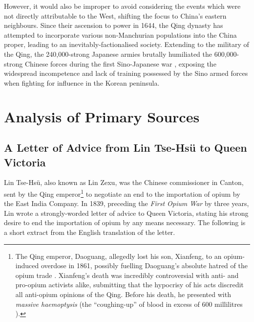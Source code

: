 \documentclass{article}
\begin{document}
However, it would also be improper to avoid considering the events which were not directly attributable to the West, shifting the focus to China's eastern neighbours. Since their ascension to power in 1644, the Qing dynasty has attempted to incorporate various non-Manchurian populations into the China proper, leading to an inevitably-factionalised society. Extending to the military of the Qing, the 240,000-strong Japanese armies brutally humiliated the 600,000-strong Chinese forces during the first Sino-Japanese war
\autocite{Fenby:2013}, exposing the widespread incompetence and lack of training possessed by the Sino armed forces
\autocite{Jowett:2013} when fighting for influence in the Korean peninsula.

\section{Analysis of Primary Sources}

\subsection{A Letter of Advice from Lin Tse-Hs\"u to Queen Victoria}

Lin Tse-Hs\"u, also known as Lin Zexu, was the Chinese commissioner in Canton, sent by the Qing emperor\footnote{The Qing emperor, Daoguang, allegedly lost his son, Xianfeng, to an opium-induced overdose in 1861, possibly fuelling Daoguang's absolute hatred of the opium trade
\autocite{Ringmar:2013}. Xianfeng's death was incredibly controversial with anti- and pro-opium activists alike, submitting that the hypocrisy of his acts discredit all anti-opium opinions of the Qing. Before his death, he presented with \textit{massive haemoptysis} (the ``coughing-up'' of blood in excess of 600 millilitres
\autocite{Sabatine:2013}).} to negotiate an end to the importation of opium by the East India Company. In 1839, preceding the \textit{First Opium War} by three years, Lin wrote a strongly-worded letter of advice to Queen Victoria, stating his strong desire to end the importation of opium by any means necessary. The following is a short extract from the English translation of the letter.

\end{document}
